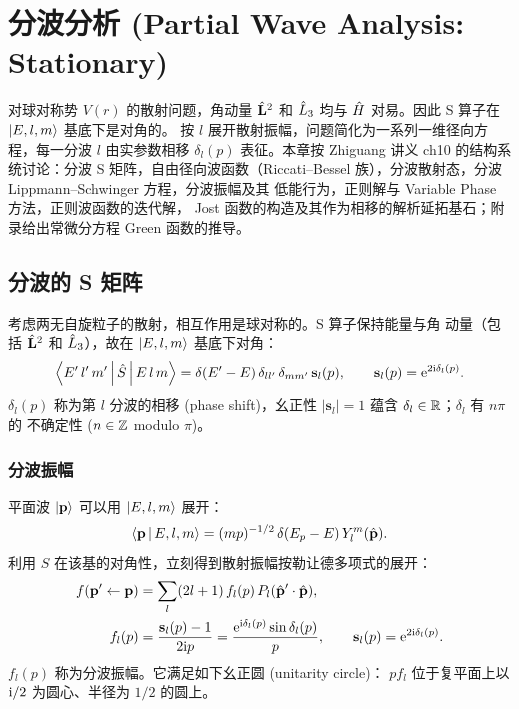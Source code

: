 \chapter{分波分析 (Partial Wave Analysis: Stationary)}\label{ch:partial}

对球对称势 $V(r)$ 的散射问题，角动量 $\hat{\mathbf L}^2$ 和 $\hat{L}_3$
均与 $\hat{H}$ 对易。因此 S 算子在 $\ket{E,l,m}$ 基底下是对角的。
按 $l$ 展开散射振幅，问题简化为一系列一维径向方程，每一分波
$l$ 由实参数相移 $\delta_l(p)$ 表征。本章按 Zhiguang 讲义 ch10
的结构系统讨论：分波 S 矩阵，自由径向波函数（Riccati--Bessel
族），分波散射态，分波 Lippmann--Schwinger 方程，分波振幅及其
低能行为，正则解与 Variable Phase 方法，正则波函数的迭代解，
Jost 函数的构造及其作为相移的解析延拓基石；附录给出常微分方程
Green 函数的推导。

\section{分波的 S 矩阵}\label{sec:pw-Smat}

考虑两无自旋粒子的散射，相互作用是球对称的。S 算子保持能量与角
动量（包括 $\hat{\mathbf L}^2$ 和 $\hat{L}_3$），故在 $\ket{E,l,m}$
基底下对角：
\begin{equation}\label{eq:Smatrix-elm}
\left\langle E'\,l'\,m' \,\middle|\, \hat{S} \,\middle|\, E\,l\,m \right\rangle
= \delta(E'-E)\,\delta_{ll'}\,\delta_{mm'}\,\mathbf{s}_l(p),
\qquad
\mathbf{s}_l(p)= \mathrm{e}^{2\mathrm{i}\delta_l(p)}.
\end{equation}
$\delta_l(p)$ 称为第 $l$ 分波的相移 (phase shift)，幺正性
$|\mathbf{s}_l|=1$ 蕴含 $\delta_l\in\mathbb{R}$；$\delta_l$ 有 $n\pi$ 的
不确定性 ($n\in\mathbb{Z}$ modulo $\pi$)。

\subsection{分波振幅}

平面波 $\ket{\mathbf p}$ 可以用 $\ket{E,l,m}$ 展开：
\begin{equation}\label{eq:p-Elm}
\left\langle \mathbf p \,\middle|\, E,l,m \right\rangle= (mp)^{-1/2}\,\delta(E_p-E)\,Y_l^m(\hat{\mathbf p}).
\end{equation}
利用 $S$ 在该基的对角性，立刻得到散射振幅按勒让德多项式的展开：
\begin{align}\label{eq:f-PW}
f(\mathbf p'\leftarrow\mathbf p)
&= \sum_l (2l+1)\,f_l(p)\,P_l(\hat{\mathbf p}'\cdot\hat{\mathbf p}),\\
f_l(p) &= \frac{\mathbf s_l(p)-1}{2\mathrm{i} p}
       = \frac{\mathrm{e}^{\mathrm{i}\delta_l(p)}\sin\delta_l(p)}{p},
\qquad \mathbf s_l(p)=\mathrm{e}^{2\mathrm{i}\delta_l(p)}.\label{eq:fl-ch10}
\end{align}
$f_l(p)$ 称为分波振幅。它满足如下幺正圆 (unitarity circle)：
$pf_l$ 位于复平面上以 $\mathrm{i}/2$ 为圆心、半径为 $1/2$ 的圆上。

